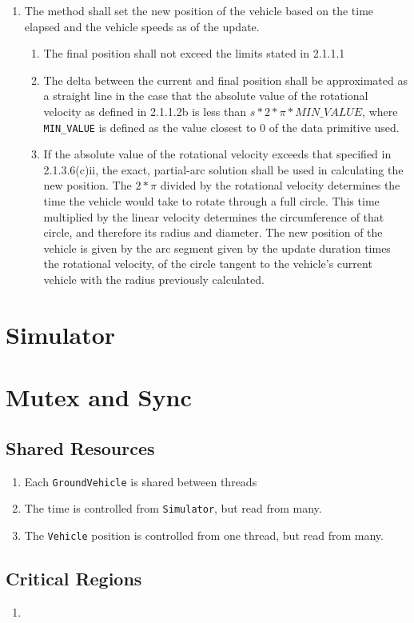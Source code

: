 \documentclass{article}
\begin{document}
\begin{enumerate}
\begin{enumerate}
		\item The method shall set the new position of the vehicle based on the time elapsed and the vehicle speeds as of the update.
		\begin{enumerate}
			\item The final position shall not exceed the limits stated in 2.1.1.1
			\item The delta between the current and final position shall be approximated as a straight line in the case that the absolute value of the rotational velocity as defined in 2.1.1.2b is less than $s*2*\pi*MIN\_VALUE$, where \verb|MIN_VALUE| is defined as the value closest to 0 of the data primitive used.
			\item If the absolute value of the rotational velocity exceeds that specified in 2.1.3.6(c)ii, the exact, partial-arc solution shall be used in calculating the new position.  The $2*\pi$ divided by the rotational velocity determines the time the vehicle would take to rotate through a full circle.  This time multiplied by the linear velocity determines the circumference of that circle, and therefore its radius and diameter.  The new position of the vehicle is given by the arc segment given by the update duration times the rotational velocity, of the circle tangent to the vehicle's current vehicle with the radius previously calculated.
		\end{enumerate}
	\end{enumerate}
\end{enumerate}

\section{Simulator}

\section{Mutex and Sync}
\subsection{Shared Resources}
\begin{enumerate}
	\item Each \verb|GroundVehicle| is shared between threads
	\item The time is controlled from \verb|Simulator|, but read from many.
	\item The \verb|Vehicle| position is controlled from one thread, but read from many.
\end{enumerate}
\subsection{Critical Regions}
\begin{enumerate}
	\item 
\end{enumerate}
\end{document}
